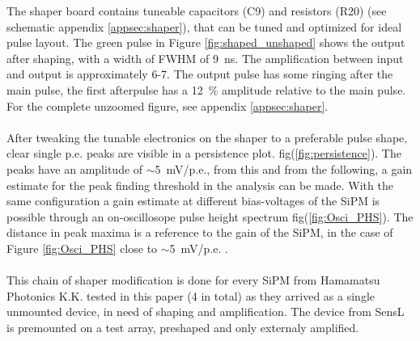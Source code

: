 \documentclass[12pt,article,type=msc,colorback,accentcolor=tud9c]{tudthesis}
\begin{document}
The shaper board contains tuneable capacitors (C9) and resistors (R20) (see schematic appendix {\ref{appsec:shaper}}), that can be tuned and optimized for ideal pulse layout. The green pulse in Figure \ref{fig:shaped_unshaped} shows the output after shaping, with a width of FWHM of 9~ns. The amplification between input and output is approximately 6-7. The output pulse has some ringing after the main pulse, the first afterpulse has a 12~$\%$ amplitude relative to the main pulse. For the complete unzoomed figure, see appendix {\ref{appsec:shaper}}. \\\\
After tweaking the tunable electronics on the shaper to a preferable pulse shape, clear single p.e. peaks are visible in a persistence plot. fig(\ref{fig:persistence}). The peaks have an amplitude of $\sim$5~mV/p.e., from this and from the following, a gain estimate for the peak finding threshold in the analysis can be made. With the same configuration a gain estimate at different bias-voltages of the SiPM is possible through an on-oscillosope pulse height spectrum fig(\ref{fig:Osci_PHS}). The distance in peak maxima is a reference to the gain of the SiPM, in the case of Figure \ref{fig:Osci_PHS} close to $\sim$5~mV/p.e. .\\\\
This chain of shaper modification is done for every SiPM from Hamamatsu Photonics K.K. tested in this paper (4 in total) as they arrived as a single unmounted device, in need of shaping and amplification. The device from SensL is premounted on a test array, preshaped and only externaly amplified.








\clearpage
\end{document}
